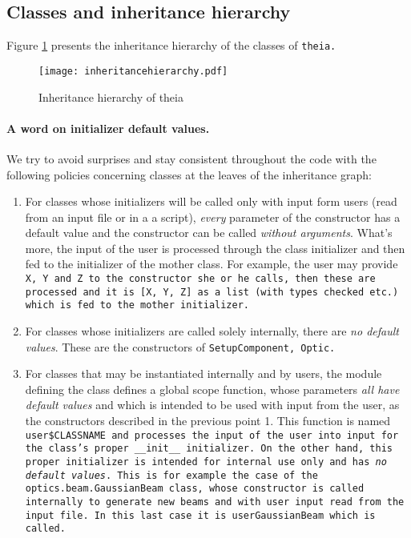 \documentclass{article}
\begin{document}
\subsection{Classes and inheritance hierarchy}
Figure \ref{inheritancehierarchy} presents the inheritance hierarchy of the classes of \tt{theia}.

\begin{figure}[h]
\begin{center}
\texttt{[image: inheritancehierarchy.pdf]}
\caption{Inheritance hierarchy of theia}
\label{inheritancehierarchy}
\end{center}
\end{figure}
\paragraph{A word on initializer default values.}We try to avoid surprises and stay consistent throughout the code with the following policies concerning classes at the leaves of the inheritance graph:

\begin{enumerate}
\item For classes whose initializers will be called only with input form users (read from an input file or in a a script), \textit{every} parameter of the constructor has a default value and the constructor can be called \textit{without arguments}. What's more, the input of the user is processed through the class initializer and then fed to the initializer of the mother class. For example, the user may provide \tt{X}, \tt{Y} and \tt{Z} to the constructor she or he calls, then these are processed and it is \tt{[X, Y, Z]} as a list (with types checked etc.) which is fed to the mother initializer.

\item For classes whose initializers are called solely internally, there are \textit{no default values}. These are the constructors of \tt{SetupComponent}, \tt{Optic}.

\item For classes that may be instantiated internally and by users, the module defining the class defines a global scope function, whose parameters \textit{all have default values} and which is intended to be used with input from the user, as the constructors described in the previous point 1. This function is named \tt{user\$CLASSNAME} and processes the input of the user into input for the class's proper \tt{\_\_init\_\_} initializer. On the other hand, this proper initializer is intended for internal use only and has \textit{no default values}. This is for example the case of the \tt{optics.beam.GaussianBeam} class, whose constructor is called internally to generate new beams and with user input read from the input file. In this last case it is \tt{userGaussianBeam} which is called.
\end{enumerate}
\end{document}
